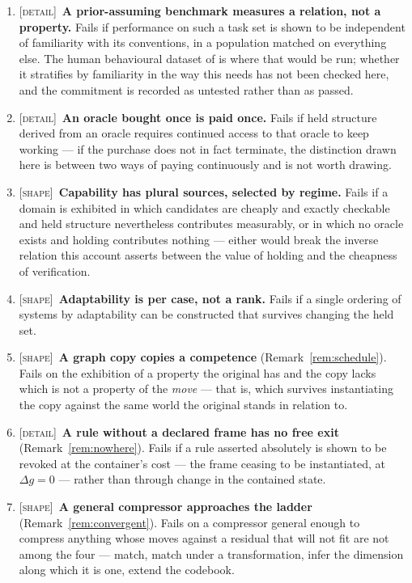 \documentclass[11pt,a4paper]{article}
\theoremstyle{remark}
\begin{document}
\begin{enumerate}[leftmargin=*]
\item \textsc{[detail]}~\textbf{A prior-assuming benchmark measures a relation, not a property.} Fails
if performance on such a task set is shown to be independent of familiarity with its conventions, in a
population matched on everything else. The human behavioural dataset of \citet{legris2025} is where
that would be run; whether it stratifies by familiarity in the way this needs has not been checked
here, and the commitment is recorded as untested rather than as passed.
\item \textsc{[detail]}~\textbf{An oracle bought once is paid once.} Fails if held structure derived
from an oracle requires continued access to that oracle to keep working --- if the purchase does not in
fact terminate, the distinction drawn here is between two ways of paying continuously and is not worth
drawing.
\item \textsc{[shape]}~\textbf{Capability has plural sources, selected by regime.} Fails if a domain is
exhibited in which candidates are cheaply and exactly checkable and held structure nevertheless
contributes measurably, or in which no oracle exists and holding contributes nothing --- either would
break the inverse relation this account asserts between the value of holding and the cheapness of
verification.
\item \textsc{[shape]}~\textbf{Adaptability is per case, not a rank.} Fails if a single ordering of
systems by adaptability can be constructed that survives changing the held set.
\item \textsc{[shape]}~\textbf{A graph copy copies a competence} (Remark~\ref{rem:schedule}). Fails on
the exhibition of a property the original has and the copy lacks which is not a property of the
\emph{move} --- that is, which survives instantiating the copy against the same world the original
stands in relation to.
\item \textsc{[detail]}~\textbf{A rule without a declared frame has no free exit}
(Remark~\ref{rem:nowhere}). Fails if a rule asserted absolutely is shown to be revoked at the
container's cost --- the frame ceasing to be instantiated, at $\Delta g = 0$ --- rather than through
change in the contained state.
\item \textsc{[shape]}~\textbf{A general compressor approaches the ladder}
(Remark~\ref{rem:convergent}). Fails on a compressor general enough to compress anything whose moves
against a residual that will not fit are not among the four --- match, match under a transformation,
infer the dimension along which it is one, extend the codebook.

\end{enumerate}
\end{document}
